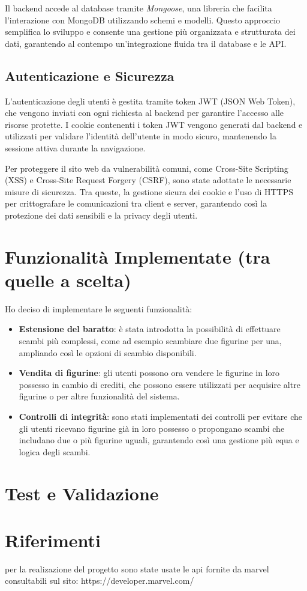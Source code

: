 \documentclass{article}
\begin{document}
    Il backend accede al database tramite \textit{Mongoose}, una libreria che facilita l'interazione con MongoDB utilizzando schemi e modelli. Questo approccio semplifica lo sviluppo e consente una gestione più organizzata e strutturata dei dati, garantendo al contempo un'integrazione fluida tra il database e le API.
    
    \subsection*{Autenticazione e Sicurezza}
    L'autenticazione degli utenti è gestita tramite token JWT (JSON Web Token), che vengono inviati con ogni richiesta al backend per garantire l'accesso alle risorse protette. I cookie contenenti i token JWT vengono generati dal backend e utilizzati per validare l'identità dell'utente in modo sicuro, mantenendo la sessione attiva durante la navigazione.
    
    Per proteggere il sito web da vulnerabilità comuni, come Cross-Site Scripting (XSS) e Cross-Site Request Forgery (CSRF), sono state adottate le necessarie misure di sicurezza. Tra queste, la gestione sicura dei cookie e l'uso di HTTPS per crittografare le comunicazioni tra client e server, garantendo così la protezione dei dati sensibili e la privacy degli utenti.
    
\section{Funzionalità Implementate (tra quelle a scelta)}
    Ho deciso di implementare le seguenti funzionalità:
    
    \begin{itemize}
        \item \textbf{Estensione del baratto}: è stata introdotta la possibilità di effettuare scambi più complessi, come ad esempio scambiare due figurine per una, ampliando così le opzioni di scambio disponibili.
        \item \textbf{Vendita di figurine}: gli utenti possono ora vendere le figurine in loro possesso in cambio di crediti, che possono essere utilizzati per acquisire altre figurine o per altre funzionalità del sistema.
        \item \textbf{Controlli di integrità}: sono stati implementati dei controlli per evitare che gli utenti ricevano figurine già in loro possesso o propongano scambi che includano due o più figurine uguali, garantendo così una gestione più equa e logica degli scambi.
    \end{itemize}

    


\section*{Test e Validazione}


\section*{Riferimenti}
per la realizazione del progetto sono state usate le api fornite da marvel consultabili sul sito: https://developer.marvel.com/
\end{document}
